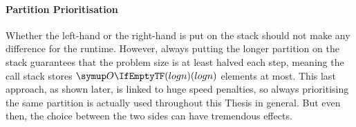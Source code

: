 %


\paragraph{Partition Prioritisation}
Whether the left-hand or the right-hand is put on the stack should not make any difference for the runtime.
However, always putting the longer partition on the stack guarantees that the problem size is at least halved each step, meaning the call stack stores \(\bigoh{log n}\) elements at most.
This last approach, as shown later, is linked to huge speed penalties, so always prioritising the same partition is actually used throughout this Thesis in general.
But even then, the choice between the two sides can have tremendous effects.




